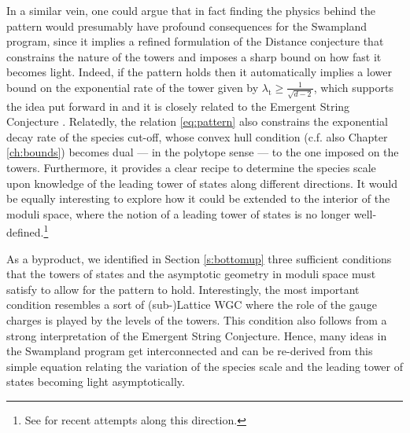 In a similar vein, one could argue that in fact finding the physics behind the pattern would presumably have profound consequences for the Swampland program, since it implies a refined formulation of the Distance conjecture that constrains the nature of the towers and imposes a sharp bound on how fast it becomes light. Indeed, if the pattern holds then it automatically implies a lower bound on the exponential rate of the tower given by $\lambda_{\text{t}} \geq \frac{1}{\sqrt{d-2}}$, which supports the idea put forward in \cite{Etheredge:2022opl} and it is closely related to the Emergent String Conjecture \cite{Lee:2019wij}. Relatedly, the relation \eqref{eq:pattern} also constrains the exponential decay rate of the species cut-off, whose convex hull condition (c.f. also Chapter \ref{ch:bounds}) becomes dual --- in the polytope sense --- to the one imposed on the towers. Furthermore, it provides a clear recipe to determine the species scale upon knowledge of the leading tower of states along different directions. It would be equally interesting to explore how it could be extended to the interior of the moduli space, where the notion of a leading tower of states is no longer well-defined.\footnote{See \cite{Rudelius:2023spc,Bedroya:2024uva} for recent attempts along this direction.}
	
As a byproduct, we identified in Section \ref{s:bottomup} three sufficient conditions that the towers of states and the asymptotic geometry in moduli space must satisfy to allow for the pattern to hold. Interestingly, the most important condition resembles a sort of (sub-)Lattice WGC where the role of the gauge charges is played by the levels of the towers. This condition also follows from a strong interpretation of the Emergent String Conjecture. Hence, many ideas in the Swampland program get interconnected and can be re-derived from this simple equation relating the variation of the species scale and the leading tower of states becoming light asymptotically. 







